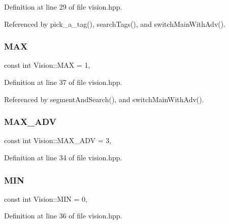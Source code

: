 Definition at line 29 of file vision.\+hpp.



Referenced by pick\+\_\+a\+\_\+tag(), search\+Tags(), and switch\+Main\+With\+Adv().

\mbox{\label{class_vision_af96e82ce8807b3c5e0651f84a04eeb9a}} 
\subsubsection{\texorpdfstring{M\+AX}{MAX}}
{\footnotesize\ttfamily const int Vision\+::\+M\+AX = 1\hspace{0.3cm}{\ttfamily [static]}, {\ttfamily [private]}}



Definition at line 37 of file vision.\+hpp.



Referenced by segment\+And\+Search(), and switch\+Main\+With\+Adv().

\mbox{\label{class_vision_ad5414bb8b9a738ec032e3673b50c1cb4}} 
\subsubsection{\texorpdfstring{M\+A\+X\+\_\+\+A\+DV}{MAX\_ADV}}
{\footnotesize\ttfamily const int Vision\+::\+M\+A\+X\+\_\+\+A\+DV = 3\hspace{0.3cm}{\ttfamily [static]}, {\ttfamily [private]}}



Definition at line 34 of file vision.\+hpp.

\mbox{\label{class_vision_a3824e4ab6a6c9beaceec70f7d3910ed0}} 
\subsubsection{\texorpdfstring{M\+IN}{MIN}}
{\footnotesize\ttfamily const int Vision\+::\+M\+IN = 0\hspace{0.3cm}{\ttfamily [static]}, {\ttfamily [private]}}



Definition at line 36 of file vision.\+hpp.



